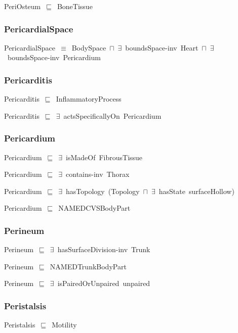 \documentclass{article}
\begin{document}
PeriOsteum~\ensuremath{\sqsubseteq}~BoneTissue~

\subsubsection*{PericardialSpace}

PericardialSpace~\ensuremath{\equiv}~BodySpace~\ensuremath{\sqcap}~\ensuremath{\exists}~boundsSpace-inv~Heart~\ensuremath{\sqcap}~\ensuremath{\exists}~boundsSpace-inv~Pericardium

\subsubsection*{Pericarditis}

Pericarditis~\ensuremath{\sqsubseteq}~InflammatoryProcess~

Pericarditis~\ensuremath{\sqsubseteq}~\ensuremath{\exists}~actsSpecificallyOn~Pericardium~

\subsubsection*{Pericardium}

Pericardium~\ensuremath{\sqsubseteq}~\ensuremath{\exists}~isMadeOf~FibrousTissue~

Pericardium~\ensuremath{\sqsubseteq}~\ensuremath{\exists}~contains-inv~Thorax~

Pericardium~\ensuremath{\sqsubseteq}~\ensuremath{\exists}~hasTopology~(Topology~\ensuremath{\sqcap}~\ensuremath{\exists}~hasState~surfaceHollow)~

Pericardium~\ensuremath{\sqsubseteq}~NAMEDCVSBodyPart~

\subsubsection*{Perineum}

Perineum~\ensuremath{\sqsubseteq}~\ensuremath{\exists}~hasSurfaceDivision-inv~Trunk~

Perineum~\ensuremath{\sqsubseteq}~NAMEDTrunkBodyPart~

Perineum~\ensuremath{\sqsubseteq}~\ensuremath{\exists}~isPairedOrUnpaired~unpaired~

\subsubsection*{Peristalsis}

Peristalsis~\ensuremath{\sqsubseteq}~Motility~
\end{document}
